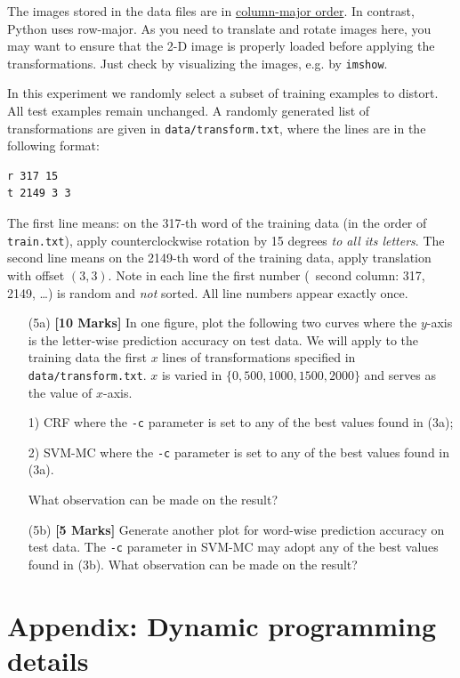 \documentclass[11pt]{report}
\begin{document}
The images stored in the data files are in \href{https://en.wikipedia.org/wiki/Row-_and_column-major_order}{column-major order}.
In contrast, Python uses row-major.
As you need to translate and rotate images here, 
you may want to ensure that the 2-D image is properly loaded before applying the transformations.  
Just check by visualizing the images, e.g. by \verb#imshow#.	

In this experiment
we randomly select a subset of training examples to distort.
All test examples remain unchanged.
A randomly generated list of transformations are given in \verb#data/transform.txt#, where the lines are in the following format:
%
\begin{verbatim}
r 317 15
t 2149 3 3
\end{verbatim}
The first line means: on the 317-th word of the training data (in the order of \verb#train.txt#),
apply counterclockwise rotation by 15 degrees \emph{to all its letters}.
The second line means on the 2149-th word of the training data, apply translation with offset $(3,3)$.
Note in each line the first number (\ie\ second column: 317, 2149, \ldots) is random and \emph{not} sorted.
All line numbers appear exactly once.

\begin{itemize}
	\item[(5a)] {\bf [10 Marks]} In one figure, plot the following two curves where the $y$-axis is the letter-wise prediction accuracy on test data.  We will apply to the training data the first $x$ lines of transformations specified in \verb#data/transform.txt#.  $x$ is varied in $\{0, 500, 1000, 1500, 2000\}$ and serves as the value of $x$-axis.
	
	1) CRF where the \verb#-c# parameter is set to any of the best values found in (3a);
	
	2) SVM-MC where the \verb#-c# parameter is set to any of the best values found in (3a).
	
	What observation can be made on the result?
	
	\item[(5b)] {\bf [5 Marks]}  Generate another plot for word-wise prediction accuracy on test data.  The \verb#-c# parameter in SVM-MC may adopt any of the best values found in (3b).
	What observation can be made on the result?
	
\end{itemize}


\section{Appendix: Dynamic programming details}
\end{document}
